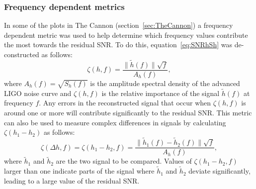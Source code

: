 \subsubsection{Frequency dependent metrics}
In some of the plots in The Cannon (section~\ref{sec:TheCannon}) a frequency dependent metric was used to help determine which frequency values contribute the most towards the residual SNR. To do this, equation~\ref{eq:SNRhSh} was de-constructed as follows:
\begin{equation}
	\zeta(h,f)=\dfrac{\|\tilde{h}(f)\|\sqrt{f}}{A_h(f)},
	\label{eq:zetah}
\end{equation}
where $A_h(f)=\sqrt{S_h(f)}$ is the amplitude spectral density of the advanced LIGO noise curve and $\zeta(h,f)$ is the relative importance of the signal $\tilde{h}(f)$ at frequency $f$. Any errors in the reconstructed signal that occur when $\zeta(h,f)$ is around one or more will contribute significantly to the residual SNR. This metric can also be used to measure complex differences in signals by calculating $\zeta(h_1-h_2)$ as follows:
\begin{equation}
	\zeta(\Delta h,f)=\zeta(h_1-h_2,f)=\dfrac{\|\tilde{h}_1(f)-\tilde{h}_2(f)\|\sqrt{f}}{A_h(f)},
	\label{eq:zetadeltah}
\end{equation}
where $\tilde{h}_1$ and $\tilde{h}_2$ are the two signal to be compared. Values of $\zeta(h_1-h_2,f)$ larger than one indicate parts of the signal where $\tilde{h}_1$ and $\tilde{h}_2$ deviate significantly, leading to a large value of the residual SNR.
